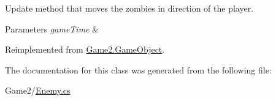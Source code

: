 Update method that moves the zombies in direction of the player. 


\begin{DoxyParams}{Parameters}
{\em game\+Time} & \\
\hline
\end{DoxyParams}


Reimplemented from \mbox{\hyperlink{class_game2_1_1_game_object_a360a294d8a55dcc747c44f8cc1aefe28}{Game2.\+Game\+Object}}.



The documentation for this class was generated from the following file\+:\begin{DoxyCompactItemize}
\item 
Game2/\mbox{\hyperlink{_enemy_8cs}{Enemy.\+cs}}\end{DoxyCompactItemize}
